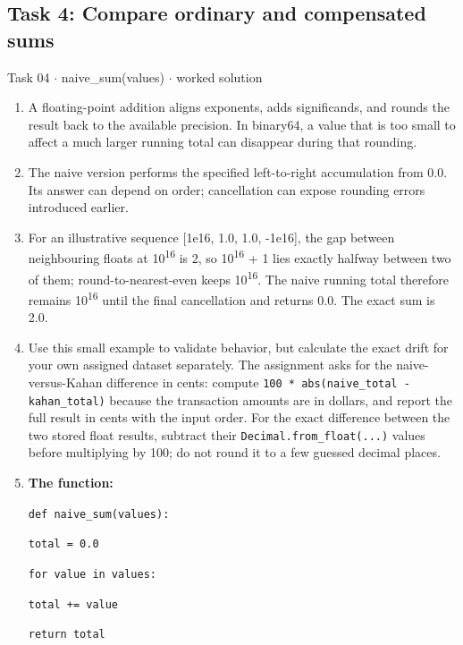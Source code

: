 \documentclass[11pt]{article}
\begin{document}
\begin{keepsection}\subsection{Task 4: Compare ordinary and compensated sums}

\begin{workedbox}{Task 04 \ensuremath{\cdot} naive\_sum(values) \ensuremath{\cdot} worked solution}
\begin{enumerate}
\item A floating-point addition aligns exponents, adds significands, and rounds the result back to the available precision. In binary64, a value that is too small to affect a much larger running total can disappear during that rounding.
\item The naive version performs the specified left-to-right accumulation from 0.0. Its answer can depend on order; cancellation can expose rounding errors introduced earlier.
\item For an illustrative sequence [1e16, 1.0, 1.0, -1e16], the gap between neighbouring floats at 10\textsuperscript{16} is 2, so 10\textsuperscript{16} + 1 lies exactly halfway between two of them; round-to-nearest-even keeps 10\textsuperscript{16}. The naive running total therefore remains 10\textsuperscript{16} until the final cancellation and returns 0.0. The exact sum is 2.0.
\item Use this small example to validate behavior, but calculate the exact drift for your own assigned dataset separately. The assignment asks for the naive-versus-Kahan difference in cents: compute \texttt{100 * abs(naive\_total - kahan\_total)} because the transaction amounts are in dollars, and report the full result in cents with the input order. For the exact difference between the two stored float results, subtract their \texttt{Decimal.from\_float(...)} values before multiplying by 100; do not round it to a few guessed decimal places.
\item {}
\textbf{The function:}
\begin{tcolorbox}[colback=Paperblue,colframe=Paperblue,boxrule=0pt,arc=0pt,left=7pt,right=7pt,top=5pt,bottom=5pt]\small\sloppy
\noindent\hspace*{0em}\texttt{def naive\_sum(values):}\par
\noindent\hspace*{1em}\texttt{total = 0.0}\par
\noindent\hspace*{1em}\texttt{for value in values:}\par
\noindent\hspace*{3em}\texttt{total += value}\par
\noindent\hspace*{1em}\texttt{return total}\par
\end{tcolorbox}
\end{enumerate}
\end{workedbox}

\end{keepsection}
\end{document}
